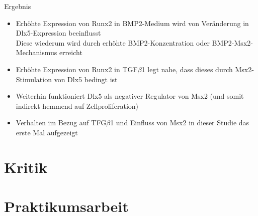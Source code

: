 \documentclass[handout]{beamer}
\begin{document}
\begin{frame}{Ergebnis}
\begin{itemize}
	\item Erh\"ohte Expression von Runx2 in BMP2-Medium wird von Ver\"anderung in Dlx5-Expression beeinflusst 
	\pause
	\\ Diese wiederum wird durch erh\"ohte BMP2-Konzentration oder BMP2-Msx2-Mechanismus erreicht
	\pause
	\item Erh\"ohte Expression von Runx2 in TGF$\beta$1 legt nahe, dass dieses durch Msx2-Stimulation von Dlx5 bedingt ist
	\pause
	\item Weiterhin funktioniert Dlx5 als negativer Regulator von Msx2 (und somit indirekt hemmend auf Zellproliferation)
	\pause
	\item Verhalten im Bezug auf TFG$\beta$1 und Einfluss von Msx2 in dieser Studie das erste Mal aufgezeigt
\end{itemize}
\end{frame}

\section{Kritik}

\section{Praktikumsarbeit}
\end{document}
